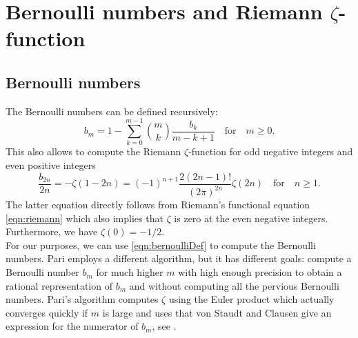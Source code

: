 \documentclass[utopia]{nmd/article}
\begin{document}
\section{Bernoulli numbers and Riemann $\zeta$-function}

\subsection{Bernoulli numbers}
The Bernoulli numbers can be defined recursively:
\begin{equation} \label{eqn:bernoulliDef}
b_m = 1 - \sum_{k=0}^{m-1} {m\choose k} \frac{b_k}{m-k+1}\quad\mbox{for}\quad m\geq 0.
\end{equation}
This also allows to compute the Riemann $\zeta$-function for odd negative integers and even positive integers
$$\frac{b_{2n}}{2n} = -\zeta(1-2n) = (-1)^{n+1} \frac{2(2n-1)!}{(2\pi)^{2n}} \zeta(2n)\quad\mbox{for}\quad n\geq 1.$$
The latter equation directly follows from Riemann's functional equation \ref{eqn:riemann} which also implies that $\zeta$ is zero at the even negative integers. Furthermore, we have $\zeta(0)=-1/2$.\\
For our purposes, we can use \eqref{eqn:bernoulliDef} to compute the Bernoulli numbers. Pari employs a different algorithm, but it has different goals: compute a Bernoulli number $b_m$ for much higher $m$ with high enough precision to obtain a rational representation of $b_m$ and without computing all the pervious Bernoulli numbers. Pari's algorithm computes $\zeta$ using the Euler product which actually converges quickly if $m$ is large and uses that von Staudt and Clausen give an expression for the numerator of $b_m$, see \cite{mcgown:bernproj,stein:bernproj}.
\end{document}
